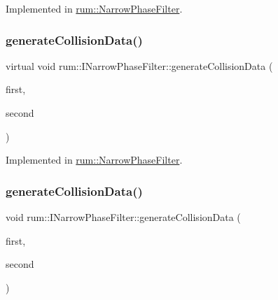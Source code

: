 Implemented in \mbox{\hyperlink{classrum_1_1_narrow_phase_filter_ab72aba07867b2cbe21bd7f046f9a5e77}{rum\+::\+Narrow\+Phase\+Filter}}.

\mbox{\label{classrum_1_1_i_narrow_phase_filter_a0f09a3143208893aa12fc9d86c7006e7}} 
\subsubsection{\texorpdfstring{generate\+Collision\+Data()}{generateCollisionData()}\hspace{0.1cm}{\footnotesize\ttfamily [3/5]}}
{\footnotesize\ttfamily virtual void rum\+::\+I\+Narrow\+Phase\+Filter\+::generate\+Collision\+Data (\begin{DoxyParamCaption}\item[{\mbox{\hyperlink{classrum_1_1_collision_box}{Collision\+Box}} $\ast$}]{first,  }\item[{\mbox{\hyperlink{classrum_1_1_collision_sphere}{Collision\+Sphere}} $\ast$}]{second }\end{DoxyParamCaption})\hspace{0.3cm}{\ttfamily [pure virtual]}}



Implemented in \mbox{\hyperlink{classrum_1_1_narrow_phase_filter_abc6c56571ea9110801cac4b57960b8b3}{rum\+::\+Narrow\+Phase\+Filter}}.

\mbox{\label{classrum_1_1_i_narrow_phase_filter_aaba5f332f2838fe7abfe8e8ee53933fe}} 
\subsubsection{\texorpdfstring{generate\+Collision\+Data()}{generateCollisionData()}\hspace{0.1cm}{\footnotesize\ttfamily [4/5]}}
{\footnotesize\ttfamily void rum\+::\+I\+Narrow\+Phase\+Filter\+::generate\+Collision\+Data (\begin{DoxyParamCaption}\item[{\mbox{\hyperlink{classrum_1_1_collision_sphere}{Collision\+Sphere}} $\ast$}]{first,  }\item[{\mbox{\hyperlink{classrum_1_1_collision_box}{Collision\+Box}} $\ast$}]{second }\end{DoxyParamCaption})\hspace{0.3cm}{\ttfamily [virtual]}}


